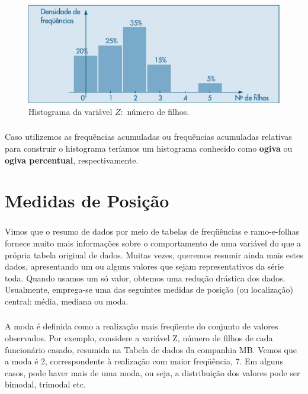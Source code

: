 \documentclass[14pt,aspectratio=1610]{beamer}
\begin{document}
\begin{frame}{}
\frametitle{}
\begin{block}{}
\justifying
\begin{figure}[H]
    \centering
    \includegraphics[scale=0.5]{Fig6}
    \caption{Histograma da variável $Z:$ número de filhos.}
    \label{Fig6_ex}
  \end{figure}
\end{block}
\end{frame}


\begin{frame}{}
\frametitle{}
\begin{block}{}
\justifying
Caso utilizemos as frequências acumuladas ou frequências acumuladas relativas para construir o histograma teríamos um histograma conhecido como {\bf ogiva} ou {\bf ogiva percentual}, respectivamente.
\end{block}
\end{frame}

\section{Medidas de Posição}
\begin{frame}{}
\frametitle{}
\begin{block}{}
\justifying
Vimos que o resumo de dados por meio de tabelas de freqüências e ramo-e-folhas fornece
muito mais informações sobre o comportamento de uma variável do que a própria tabela
original de dados. Muitas vezes, queremos resumir ainda mais estes dados, apresentando
um ou alguns valores que sejam representativos da série toda. Quando usamos um só 
valor, obtemos uma redução drástica dos dados. Usualmente, emprega-se uma das seguintes medidas de posição (ou localização) central: média, mediana ou moda.
\end{block}
\end{frame}

\begin{frame}{}
\frametitle{}
\begin{block}{}
\justifying
A moda é definida como a realização mais freqüente do conjunto de valores observados.
Por exemplo, considere a variável Z, número de filhos de cada funcionário casado,  resumida na Tabela de dados da companhia MB. Vemos que a moda é 2, correspondente à realização com maior freqüência, 7. Em alguns casos, pode haver mais de uma moda, ou seja, a distribuição dos valores pode ser bimodal, trimodal etc.
\end{block}
\end{frame}
\end{document}
